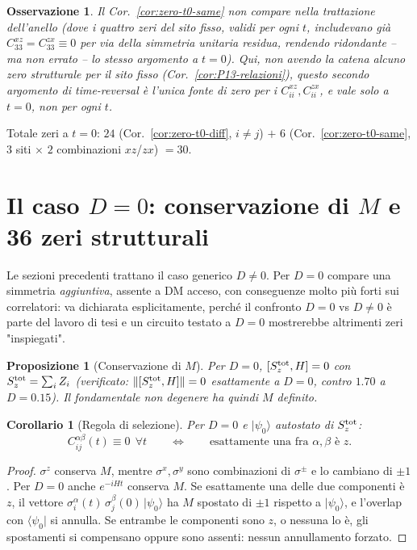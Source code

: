 \documentclass[11pt,a4paper]{article}
\newtheorem{proposizione}{Proposizione}
\newtheorem{corollario}{Corollario}
\newtheorem{osservazione}{Osservazione}
\begin{document}
\begin{osservazione}
Il Cor.~\ref{cor:zero-t0-same} non compare nella trattazione dell'anello (dove i quattro zeri del
sito fisso, validi per \emph{ogni} $t$, includevano già $C_{33}^{xz}=C_{33}^{zx}\equiv0$ per via
della simmetria unitaria residua, rendendo ridondante -- ma non errato -- lo stesso argomento a
$t=0$). Qui, non avendo la catena alcuno zero strutturale per il sito fisso (Cor.~\ref{cor:P13-relazioni}),
questo secondo argomento di time-reversal è l'\emph{unica} fonte di zero per i $C_{ii}^{xz},
C_{ii}^{zx}$, e vale solo a $t=0$, non per ogni $t$.
\end{osservazione}

Totale zeri a $t=0$: $24$ (Cor.~\ref{cor:zero-t0-diff}, $i\neq j$) $+$ $6$ (Cor.~\ref{cor:zero-t0-same},
$3$ siti $\times$ $2$ combinazioni $xz$/$zx$) $=30$.

\section{Il caso \texorpdfstring{$D=0$}{D=0}: conservazione di \texorpdfstring{$M$}{M} e 36 zeri strutturali}
\label{sec:D0}

Le sezioni precedenti trattano il caso generico $D\neq0$. Per $D=0$ compare una simmetria
\emph{aggiuntiva}, assente a DM acceso, con conseguenze molto più forti sui correlatori: va
dichiarata esplicitamente, perché il confronto $D=0$ vs $D\neq0$ è parte del lavoro di tesi e
un circuito testato a $D=0$ mostrerebbe altrimenti zeri "inspiegati".

\begin{proposizione}[Conservazione di $M$]
Per $D=0$, $[S_z^{\rm tot},H]=0$ con $S_z^{\rm tot}=\sum_i Z_i$ (verificato:
$\|[S_z^{\rm tot},H]\|=0$ esattamente a $D=0$, contro $1.70$ a $D=0.15$). Il fondamentale non
degenere ha quindi $M$ definito.
\end{proposizione}

\begin{corollario}[Regola di selezione]
\label{cor:selezione-M}
Per $D=0$ e $|\psi_0\rangle$ autostato di $S_z^{\rm tot}$:
\begin{equation}
C_{ij}^{\alpha\beta}(t)\equiv0\ \ \forall t
\qquad\Longleftrightarrow\qquad
\text{esattamente una fra }\alpha,\beta\text{ è }z.
\end{equation}
\end{corollario}
\begin{proof}
$\sigma^z$ conserva $M$, mentre $\sigma^x,\sigma^y$ sono combinazioni di $\sigma^\pm$ e lo
cambiano di $\pm1$. Per $D=0$ anche $e^{-iHt}$ conserva $M$. Se esattamente una delle due
componenti è $z$, il vettore
$\sigma_i^\alpha(t)\,\sigma_j^\beta(0)\,|\psi_0\rangle$
ha $M$ spostato di $\pm1$ rispetto a $|\psi_0\rangle$, e l'overlap con
$\langle\psi_0|$ si annulla. Se entrambe le componenti sono $z$, o nessuna lo è, gli
spostamenti si compensano oppure sono assenti: nessun annullamento forzato.
\end{proof}
\end{document}
